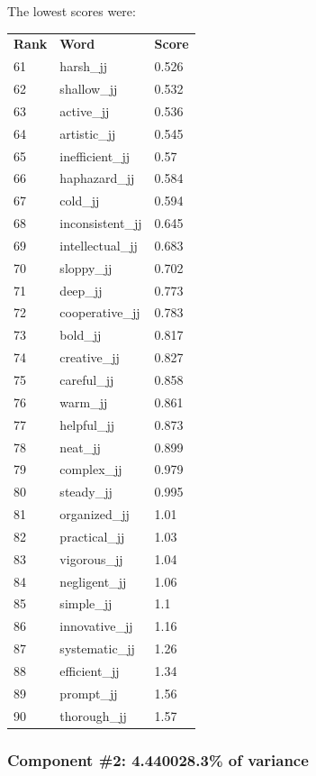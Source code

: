 \documentclass[10pt,letterpaper]{book}
\begin{document}
The lowest scores were:
\begin{tabular}{ l l l }
        \textbf{Rank} & \textbf{Word} & \textbf{Score} \\
        61 & harsh\_jj & 0.526 \\
        62 & shallow\_jj & 0.532 \\
        63 & active\_jj & 0.536 \\
        64 & artistic\_jj & 0.545 \\
        65 & inefficient\_jj & 0.57 \\
        66 & haphazard\_jj & 0.584 \\
        67 & cold\_jj & 0.594 \\
        68 & inconsistent\_jj & 0.645 \\
        69 & intellectual\_jj & 0.683 \\
        70 & sloppy\_jj & 0.702 \\
        71 & deep\_jj & 0.773 \\
        72 & cooperative\_jj & 0.783 \\
        73 & bold\_jj & 0.817 \\
        74 & creative\_jj & 0.827 \\
        75 & careful\_jj & 0.858 \\
        76 & warm\_jj & 0.861 \\
        77 & helpful\_jj & 0.873 \\
        78 & neat\_jj & 0.899 \\
        79 & complex\_jj & 0.979 \\
        80 & steady\_jj & 0.995 \\
        81 & organized\_jj & 1.01 \\
        82 & practical\_jj & 1.03 \\
        83 & vigorous\_jj & 1.04 \\
        84 & negligent\_jj & 1.06 \\
        85 & simple\_jj & 1.1 \\
        86 & innovative\_jj & 1.16 \\
        87 & systematic\_jj & 1.26 \\
        88 & efficient\_jj & 1.34 \\
        89 & prompt\_jj & 1.56 \\
        90 & thorough\_jj & 1.57 \\
\end{tabular}
\subsubsection{Component \#2: 4.440028.3\% of variance}
\end{document}
